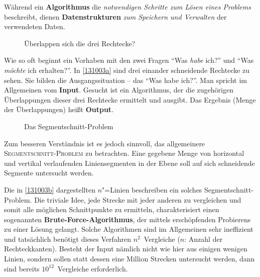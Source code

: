 \documentclass[ngerman,draft,parskip=half*,twoside]{scrreprt}
\theoremstyle{break}
\theoremstyle{nonumberbreak}
\begin{document}
Während ein \textbf{Algorithmus} die \emph{notwendigen Schritte zum Lösen
eines Problems} beschreibt, dienen \textbf{Datenstrukturen}
\emph{zum Speichern und Verwalten} der verwendeten Daten.  

\begin{figure}
  \centering
%  
  \caption{Überlappen sich die drei Rechtecke?}
  \label{131003a}
\end{figure}

Wie so oft beginnt ein Vorhaben mit den zwei Fragen "`Was \emph{habe}
ich?"' und "`Was \emph{möchte} ich erhalten?"'. In \autoref{131003a}
sind drei einander schneidende Rechtecke zu sehen. Sie bilden die
Ausgangssituation -- das "`Was habe ich?"'. Man spricht im Allgemeinen vom
\textbf{Input}. Gesucht ist ein Algorithmus, der die zugehörigen
Überlappungen dieser drei Rechtecke ermittelt und ausgibt. Das Ergebnis (Menge der Überlappungen)
heißt \textbf{Output}.

\begin{figure}
  \centering
%  
  \caption{Das Segmentschnitt-Problem}
  \label{131003b}
\end{figure}

Zum besseren Verständnis ist es jedoch sinnvoll, das allgemeinere
\textsc{Segmentschnitt-Problem} zu betrachten. Eine
gegebene Menge von horizontal und vertikal verlaufenden Liniensegmenten
in der Ebene soll auf sich schneidende Segmente untersucht werden.

Die in \autoref{131003b} dargestellten $n$"=Linien beschreiben ein
solches Segmentschnitt-Problem. Die triviale Idee, jede Strecke mit jeder
anderen zu vergleichen und somit alle möglichen Schnittpunkte zu
ermitteln, charakterisiert einen sogenannten
\textbf{Brute-Force-Algorithmus}, der mittels erschöpfenden Probierens zu
einer Lösung gelangt. Solche Algorithmen sind im Allgemeinen sehr
ineffizient und tatsächlich benötigt dieses Verfahren $n^2$~Vergleiche
($n$: Anzahl der Rechteckkanten). Besteht der Input nämlich nicht wie
hier aus einigen wenigen Linien, sondern sollen statt dessen eine Million
Strecken untersucht werden, dann sind bereits $10^{12}$~Vergleiche
erforderlich.
\end{document}
